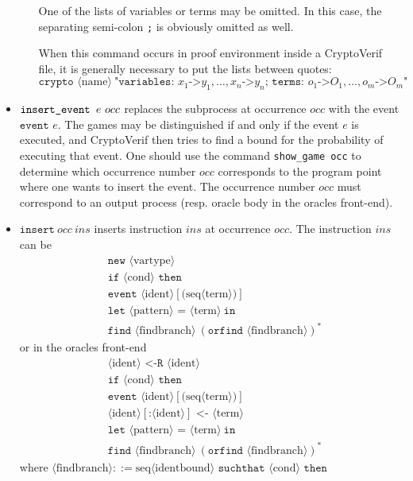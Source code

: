 \documentclass{article}
\newcommand{\nonterm}[1]{\langle\textrm{#1}\rangle}
\newcommand{\seq}[1]{\textrm{seq}\nonterm{#1}}
\begin{document}
\begin{itemize}
\begin{itemize}
One of the lists of variables or terms may be omitted.
In this case, the separating semi-colon \texttt{;} is obviously
omitted as well.

When this command occurs in proof environment inside a CryptoVerif
file, it is generally necessary to put the lists between quotes:
\[\texttt{crypto }\nonterm{name}\ 
\texttt{"variables: }x_1\texttt{->}y_1,\ldots, x_n\texttt{->}y_n
\texttt{; terms: }o_1\texttt{->}O_1,\ldots,o_m\texttt{->}O_m\texttt{"}\]

\end{itemize}


\item $\texttt{insert\string_event }e\ occ$ replaces the subprocess at
occurrence $occ$ with the event $\texttt{event }e$. The games may
be distinguished if and only if the event $e$ is executed, and CryptoVerif
then tries to find a bound for the probability of executing that event.
One should use the command \texttt{show\string_game occ} to determine
which occurrence number $occ$ corresponds to the program point where
one wants to insert the event. The occurrence number $occ$ must
correspond to an output process (resp. oracle body in the oracles
front-end).

\item $\texttt{insert}\ occ\ ins$ inserts instruction $ins$ at
occurrence $occ$. The instruction $ins$ can be 
\begin{align*}
&\texttt{new\ }\nonterm{vartype}\\
&\texttt{if }\nonterm{cond}\texttt{ then}\\
&\texttt{event }\nonterm{ident}[\texttt{(}\seq{term}\texttt{)}]\\
&\texttt{let }\nonterm{pattern} \texttt{ = }\nonterm{term}\ \texttt{in}\\
&\texttt{find }\nonterm{findbranch}\ (\texttt{orfind }\nonterm{findbranch})^*
\end{align*}
or in the oracles front-end
\begin{align*}
&\nonterm{ident}\texttt{ <-R }\nonterm{ident}\\
&\texttt{if }\nonterm{cond}\texttt{ then}\\
&\texttt{event }\nonterm{ident}[\texttt{(}\seq{term}\texttt{)}]\\
&\nonterm{ident}[\texttt{:}\nonterm{ident}] \texttt{ <- }\nonterm{term}\\
&\texttt{let }\nonterm{pattern} \texttt{ = }\nonterm{term}\ \texttt{in}\\
&\texttt{find }\nonterm{findbranch}\ (\texttt{orfind }\nonterm{findbranch})^*
\end{align*}
where $\nonterm{findbranch} ::= \seq{identbound} \texttt{ suchthat }\nonterm{cond}\texttt{ then}$


\end{itemize}
\end{document}
